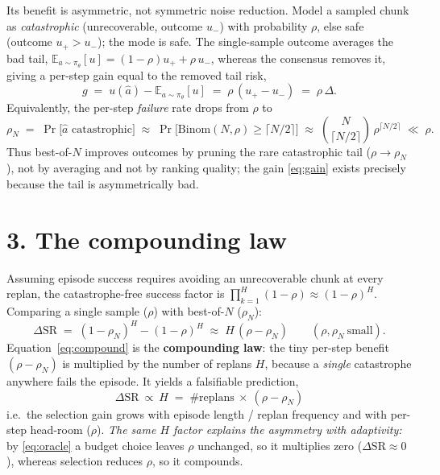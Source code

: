 \documentclass[11pt]{article}
\newcommand{\E}{\mathbb{E}}
\begin{document}
Its benefit is asymmetric, not symmetric noise reduction. Model a sampled chunk as
\emph{catastrophic} (unrecoverable, outcome $u_-$) with probability $\rho$, else safe (outcome
$u_+>u_-$); the mode is safe. The single-sample outcome averages the bad tail,
$\E_{a\sim\pi_\theta}[u]=(1-\rho)u_+ + \rho\,u_-$, whereas the consensus removes it, giving a
per-step gain equal to the removed tail risk,
\begin{equation}
  g \;=\; u(\hat a)-\E_{a\sim\pi_\theta}[u]\;=\;\rho\,(u_+-u_-)\;=\;\rho\,\Delta .
  \label{eq:gain}
\end{equation}
Equivalently, the per-step \emph{failure} rate drops from $\rho$ to
\begin{equation}
  \rho_N \;=\; \Pr\big[\hat a \text{ catastrophic}\big]
        \;\approx\; \Pr\!\big[\mathrm{Binom}(N,\rho)\ge\lceil N/2\rceil\big]
        \;\approx\; \binom{N}{\lceil N/2\rceil}\,\rho^{\lceil N/2\rceil}
        \;\ll\; \rho .
  \label{eq:rhoN}
\end{equation}
Thus best-of-$N$ improves outcomes by pruning the rare catastrophic tail
($\rho\!\to\!\rho_N$), not by averaging and not by ranking quality; the gain \eqref{eq:gain}
exists precisely because the tail is asymmetrically bad.

\section*{3. The compounding law}
Assuming episode success requires avoiding an unrecoverable chunk at every replan, the
catastrophe-free success factor is $\prod_{k=1}^{H}(1-\rho)\approx(1-\rho)^{H}$. Comparing a
single sample ($\rho$) with best-of-$N$ ($\rho_N$):
\begin{equation}
  \Delta\mathrm{SR}
  \;=\;(1-\rho_N)^{H}-(1-\rho)^{H}
  \;\approx\; H\,(\rho-\rho_N)\qquad(\rho,\rho_N\ \text{small}).
  \label{eq:compound}
\end{equation}
Equation~\eqref{eq:compound} is the \textbf{compounding law}: the tiny per-step benefit
$(\rho-\rho_N)$ is multiplied by the number of replans $H$, because a \emph{single} catastrophe
anywhere fails the episode. It yields a falsifiable prediction,
\begin{equation}
  \boxed{\ \Delta\mathrm{SR}\ \propto\ H\;=\;\#\text{replans}\ \times\ (\rho-\rho_N)\ }
  \label{eq:predict}
\end{equation}
i.e.\ the selection gain grows with episode length / replan frequency and with per-step
head-room ($\rho$). \emph{The same $H$ factor explains the asymmetry with adaptivity:} by
\eqref{eq:oracle} a budget choice leaves $\rho$ unchanged, so it multiplies zero
($\Delta\mathrm{SR}\approx0$), whereas selection reduces $\rho$, so it compounds.
\end{document}
